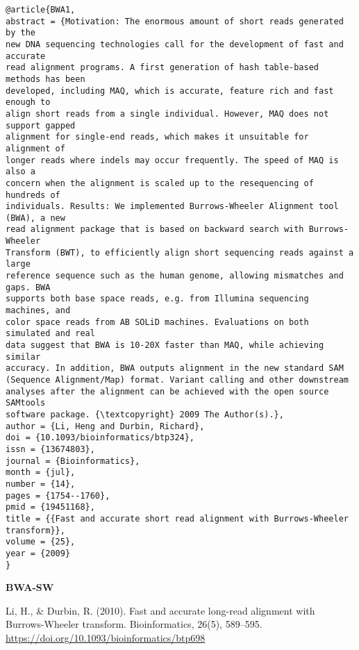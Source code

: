 \documentclass[]{article}
\begin{document}
\begin{verbatim}
@article{BWA1,
abstract = {Motivation: The enormous amount of short reads generated by the
new DNA sequencing technologies call for the development of fast and accurate
read alignment programs. A first generation of hash table-based methods has been
developed, including MAQ, which is accurate, feature rich and fast enough to
align short reads from a single individual. However, MAQ does not support gapped
alignment for single-end reads, which makes it unsuitable for alignment of
longer reads where indels may occur frequently. The speed of MAQ is also a
concern when the alignment is scaled up to the resequencing of hundreds of
individuals. Results: We implemented Burrows-Wheeler Alignment tool (BWA), a new
read alignment package that is based on backward search with Burrows-Wheeler
Transform (BWT), to efficiently align short sequencing reads against a large
reference sequence such as the human genome, allowing mismatches and gaps. BWA
supports both base space reads, e.g. from Illumina sequencing machines, and
color space reads from AB SOLiD machines. Evaluations on both simulated and real
data suggest that BWA is 10-20X faster than MAQ, while achieving similar
accuracy. In addition, BWA outputs alignment in the new standard SAM
(Sequence Alignment/Map) format. Variant calling and other downstream
analyses after the alignment can be achieved with the open source SAMtools
software package. {\textcopyright} 2009 The Author(s).},
author = {Li, Heng and Durbin, Richard},
doi = {10.1093/bioinformatics/btp324},
issn = {13674803},
journal = {Bioinformatics},
month = {jul},
number = {14},
pages = {1754--1760},
pmid = {19451168},
title = {{Fast and accurate short read alignment with Burrows-Wheeler transform}},
volume = {25},
year = {2009}
}
\end{verbatim}

\textbf{BWA-SW}

Li, H., \& Durbin, R. (2010). Fast and accurate long-read alignment with Burrows-Wheeler transform. Bioinformatics, 26(5), 589–595. \url{https://doi.org/10.1093/bioinformatics/btp698}
\end{document}
